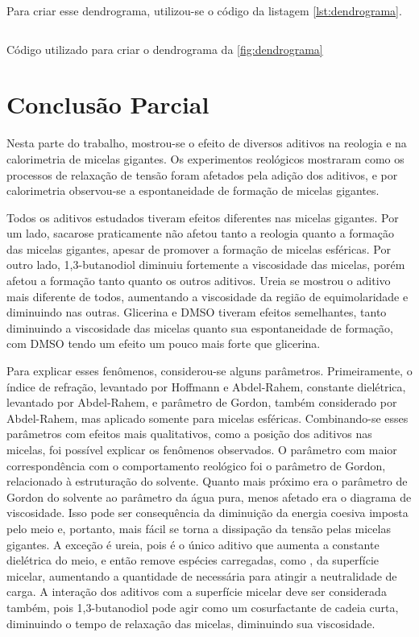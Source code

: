 		Para criar esse dendrograma, utilizou-se o código da listagem \ref{lst:dendrograma}.
		
		\begin{listing}[h]
			\inputminted{python}{./python/dendrograma.py}
			\caption{Código utilizado para criar o dendrograma da \autoref{fig:dendrograma}}
			\label{lst:dendrograma}
		\end{listing}
		\FloatBarrier

		\section{Conclusão Parcial} 
		
		Nesta parte do trabalho, mostrou-se o efeito de diversos aditivos na reologia e na calorimetria de micelas gigantes. Os experimentos reológicos mostraram como os processos de relaxação de tensão foram afetados pela adição dos aditivos, e por calorimetria observou-se a espontaneidade de formação de micelas gigantes.
		
		Todos os aditivos estudados tiveram efeitos diferentes nas micelas gigantes. Por um lado, sacarose praticamente não afetou tanto a reologia quanto a formação das micelas gigantes, apesar de promover a formação de micelas esféricas. Por outro lado, 1,3-butanodiol diminuiu fortemente a viscosidade das micelas, porém afetou a formação tanto quanto os outros aditivos. Ureia se mostrou o aditivo mais diferente de todos, aumentando a viscosidade da região de equimolaridade e diminuindo nas outras. Glicerina e DMSO tiveram efeitos semelhantes, tanto diminuindo a viscosidade das micelas quanto sua espontaneidade de formação, com DMSO tendo um efeito um pouco mais forte que glicerina.
		
		Para explicar esses fenômenos, considerou-se alguns parâmetros. Primeiramente, o índice de refração, levantado por Hoffmann e Abdel-Rahem, constante dielétrica, levantado por Abdel-Rahem, e parâmetro de Gordon, também considerado por Abdel-Rahem, mas aplicado somente para micelas esféricas. Combinando-se esses parâmetros com efeitos mais qualitativos, como a posição dos aditivos nas micelas, foi possível explicar os fenômenos observados. O parâmetro com maior correspondência com o comportamento reológico foi o parâmetro de Gordon, relacionado à estruturação do solvente. Quanto mais próximo era o parâmetro de Gordon do solvente ao parâmetro da água pura, menos afetado era o diagrama de viscosidade. Isso pode ser consequência da diminuição da energia coesiva imposta pelo meio e, portanto, mais fácil se torna a dissipação da tensão pelas micelas gigantes. A exceção é ureia, pois é o único aditivo que aumenta a constante dielétrica do meio, e então remove espécies carregadas, como \Sal, da superfície micelar, aumentando a quantidade de \Sal{} necessária para atingir a neutralidade de carga. A interação dos aditivos com a superfície micelar deve ser considerada também, pois 1,3-butanodiol pode agir como um cosurfactante de cadeia curta, diminuindo o tempo de relaxação das micelas, diminuindo sua viscosidade.
		

